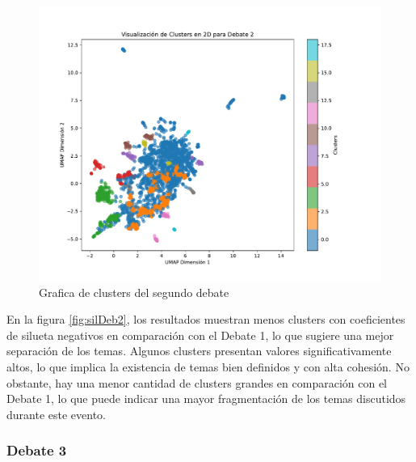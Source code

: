 \documentclass[10pt, a4paper]{article}
\begin{document}
\begin{figure}[h!]
\begin{minipage}{0.49\textwidth}
			\includegraphics[width=\linewidth]{clusters_debate2.pdf}
			\caption{Grafica de clusters del segundo debate}
			\label{fig:clustDeb2}
		\end{minipage}
	\end{figure}
	
	En la figura \ref{fig:silDeb2}, los resultados muestran menos clusters con coeficientes de silueta negativos en comparación con el Debate 1, lo que sugiere una mejor separación de los temas. Algunos clusters presentan valores significativamente altos, lo que implica la existencia de temas bien definidos y con alta cohesión. No obstante, hay una menor cantidad de clusters grandes en comparación con el Debate 1, lo que puede indicar una mayor fragmentación de los temas discutidos durante este evento.
	
	\subsubsection{Debate 3}
\end{document}
